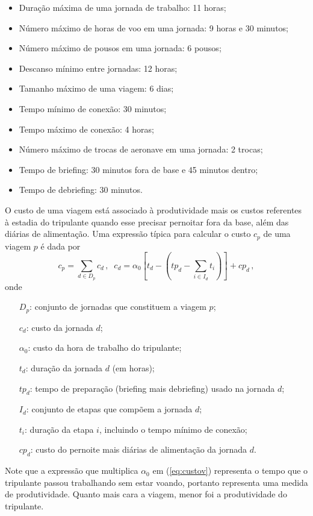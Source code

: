 \documentclass[12pt,a4paper]{article}
\newcommand{\ev}{\, ,}                                       %
\begin{document}
\begin{itemize}
	\item Duração máxima de uma jornada de trabalho: 11 horas;
	\item Número máximo de horas de voo em uma jornada: 9 horas e 30 minutos;
	\item Número máximo de pousos em uma jornada: 6 pousos;
	\item Descanso mínimo entre jornadas: 12 horas;
	\item Tamanho máximo de uma viagem: 6 dias;
	\item Tempo mínimo de conexão: 30 minutos;
	\item Tempo máximo de conexão: 4 horas;
	\item Número máximo de trocas de aeronave em uma jornada: 2 trocas;
	\item Tempo de briefing: 30 minutos fora de base e 45 minutos dentro;
	\item Tempo de debriefing: 30 minutos.
\end{itemize}

O custo de uma viagem está associado à produtividade mais os custos referentes à estadia do 
tripulante quando esse precisar pernoitar fora da base, além das diárias de alimentação. Uma 
expressão típica para calcular o custo $c_p$ de uma viagem $p$ é dada por
%
\begin{equation} \label{eq:custov} 
	c_p = \sum_{d \in D_p} c_d \, , \;\;
	c_d = \alpha_0 \left[t_d - \left(tp_d - \sum_{i \in I_d} t_i\right)\right] + cp_d \ev
\end{equation} 
%
onde
%
\begin{itemize}
	\item[$D_p$:] conjunto de jornadas que constituem a viagem $p$;
	\item[$c_d$:] custo da jornada $d$;
	\item[$\alpha_0$:] custo da hora de trabalho do tripulante;
	\item[$t_d$:] duração da jornada $d$ (em horas);	
	\item[$tp_d$:] tempo de preparação (briefing mais debriefing) usado na jornada $d$;
	\item[$I_d$:] conjunto de etapas que compõem a jornada $d$;
	\item[$t_i$:] duração da etapa $i$, incluindo o tempo mínimo de conexão;
	\item[$cp_d$:] custo do pernoite mais diárias de alimentação da jornada $d$.
\end{itemize}
%
Note que a expressão que multiplica $\alpha_0$ em (\ref{eq:custov}) representa o tempo que o
tripulante passou trabalhando sem estar voando, portanto representa uma medida de produtividade.
Quanto mais cara a viagem, menor foi a produtividade do tripulante.
\end{document}
